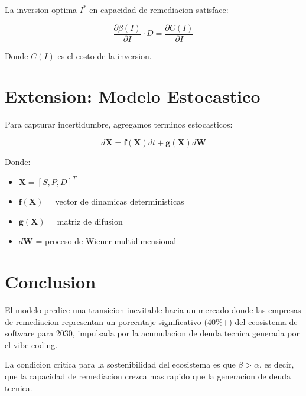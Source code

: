 \documentclass{article}
\begin{document}
La inversion optima $I^*$ en capacidad de remediacion satisface:

\begin{equation}
\frac{\partial \beta(I)}{\partial I} \cdot D = \frac{\partial C(I)}{\partial I}
\end{equation}

Donde $C(I)$ es el costo de la inversion.

\section{Extension: Modelo Estocastico}

Para capturar incertidumbre, agregamos terminos estocasticos:

\begin{equation}
d\mathbf{X} = \mathbf{f}(\mathbf{X}) dt + \mathbf{g}(\mathbf{X}) d\mathbf{W}
\end{equation}

Donde:
\begin{itemize}
    \item $\mathbf{X} = [S, P, D]^T$
    \item $\mathbf{f}(\mathbf{X})$ = vector de dinamicas deterministicas
    \item $\mathbf{g}(\mathbf{X})$ = matriz de difusion
    \item $d\mathbf{W}$ = proceso de Wiener multidimensional
\end{itemize}

\section{Conclusion}

El modelo predice una transicion inevitable hacia un mercado donde las empresas de remediacion representan un porcentaje significativo (40\%+) del ecosistema de software para 2030, impulsada por la acumulacion de deuda tecnica generada por el vibe coding.

La condicion critica para la sostenibilidad del ecosistema es que $\beta > \alpha$, es decir, que la capacidad de remediacion crezca mas rapido que la generacion de deuda tecnica.
\end{document}
